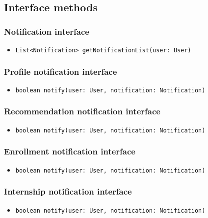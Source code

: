 \subsection{Interface methods}

\subsubsection{Notification interface}
\begin{itemize}
    \item \verb|List<Notification> getNotificationList(user: User)|
\end{itemize}

\subsubsection{Profile notification interface}
\begin{itemize}
    \item \verb|boolean notify(user: User, notification: Notification)|
\end{itemize}

\subsubsection{Recommendation notification interface}
\begin{itemize}
    \item \verb|boolean notify(user: User, notification: Notification)|
\end{itemize}

\subsubsection{Enrollment notification interface}
\begin{itemize}
    \item \verb|boolean notify(user: User, notification: Notification)|
\end{itemize}

\subsubsection{Internship notification interface}
\begin{itemize}
    \item \verb|boolean notify(user: User, notification: Notification)|
\end{itemize}

